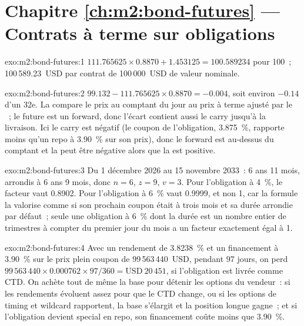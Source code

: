 \section*{Chapitre \ref{ch:m2:bond-futures} --- Contrats à terme sur obligations}

\begin{solution}{exo:m2:bond-futures:1}
$111.765625 \times 0.8870 + 1.453125 = 100.589234$ pour 100~; 100\,589.23~USD par
contrat de 100\,000~USD de valeur nominale.
\end{solution}

\begin{solution}{exo:m2:bond-futures:2}
$99.132 - 111.765625 \times 0.8870 = -0.004$, soit environ $-0.14$ d'un 32e. La 
compare le prix au comptant du jour au prix à terme ajusté par le ~;
le future est un forward, donc l'écart contient aussi le carry jusqu'à la livraison.
Ici le carry est négatif (le coupon de l'obligation, 3.875~\%, rapporte moins qu'un repo à 3.90~\%
sur son prix), donc le forward est au-dessus du comptant et la  peut
être négative alors que la  est positive.
\end{solution}

\begin{solution}{exo:m2:bond-futures:3}
Du 1 décembre 2026 au 15 novembre 2033~: 6 ans 11 mois, arrondis à
6 ans 9 mois, donc $n = 6$, $z = 9$, $v = 3$. Pour l'obligation à 4~\%, le facteur vaut 0.8902. Pour l'obligation à 6~\%
vaut 0.9999, et non 1, car la formule la valorise comme si son prochain coupon
était à trois mois et sa durée arrondie par défaut~; seule une obligation à 6~\% dont la durée est un
nombre entier de trimestres à compter du premier jour du mois a un facteur
exactement égal à 1.
\end{solution}

\begin{solution}{exo:m2:bond-futures:4}
Avec un rendement de 3.8238~\% et un financement à 3.90~\% sur le prix plein coupon de 99\,563\,440~USD, pendant 97
jours, on perd $99\,563\,440 \times 0.000762 \times 97/360 = \text{USD}~20\,451$, si
l'obligation est livrée comme CTD. On achète tout de même la base pour détenir les options du vendeur~:
si les rendements évoluent assez pour que le CTD change, ou si les options de timing et wildcard
rapportent, la base s'élargit et la position longue gagne~; et si l'obligation devient
special en repo, son financement coûte moins que 3.90~\%.
\end{solution}

